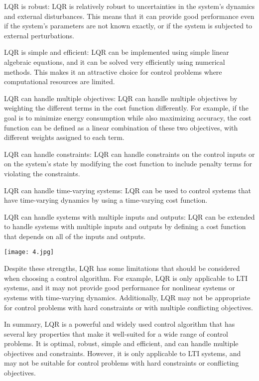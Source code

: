 \documentclass[12pt]{article}
\begin{document}
LQR is robust: LQR is relatively robust to uncertainties in the system's dynamics and external disturbances. This means that it can provide good performance even if the system's parameters are not known exactly, or if the system is subjected to external perturbations.

LQR is simple and efficient: LQR can be implemented using simple linear algebraic equations, and it can be solved very efficiently using numerical methods. This makes it an attractive choice for control problems where computational resources are limited.

LQR can handle multiple objectives: LQR can handle multiple objectives by weighting the different terms in the cost function differently. For example, if the goal is to minimize energy consumption while also maximizing accuracy, the cost function can be defined as a linear combination of these two objectives, with different weights assigned to each term.

LQR can handle constraints: LQR can handle constraints on the control inputs or on the system's state by modifying the cost function to include penalty terms for violating the constraints.

LQR can handle time-varying systems: LQR can be used to control systems that have time-varying dynamics by using a time-varying cost function.

LQR can handle systems with multiple inputs and outputs: LQR can be extended to handle systems with multiple inputs and outputs by defining a cost function that depends on all of the inputs and outputs.







\texttt{[image: 4.jpg]}







Despite these strengths, LQR has some limitations that should be considered when choosing a control algorithm. For example, LQR is only applicable to LTI systems, and it may not provide good performance for nonlinear systems or systems with time-varying dynamics. Additionally, LQR may not be appropriate for control problems with hard constraints or with multiple conflicting objectives.

In summary, LQR is a powerful and widely used control algorithm that has several key properties that make it well-suited for a wide range of control problems. It is optimal, robust, simple and efficient, and can handle multiple objectives and constraints. However, it is only applicable to LTI systems, and may not be suitable for control problems with hard constraints or conflicting objectives.
\end{document}
